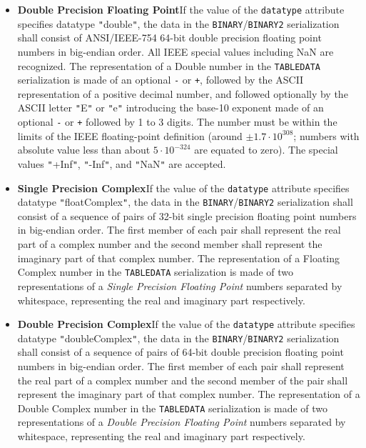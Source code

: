 \documentclass[11pt,a4paper]{ivoa}
\let\fg=\color
\def\attr#1{{\tt{\fg{DarkRed}#1}}}
\def\elem#1{{\tt{\fg{DarkRed}#1}}}
\def\literalvalue#1{{\tt"}{{\fg{DarkPurple}#1}}{\tt"}}
\begin{document}
\begin{itemize}
\item {\bf Double Precision Floating Point}\quad If
the value of the {\attr{datatype}}
attribute specifies datatype {\literalvalue{double}},
the data in the \elem{BINARY}/\elem{BINARY2} serialization shall consist of ANSI/IEEE-754
64-bit double precision floating point numbers in big-endian order.
All IEEE special values including NaN are recognized.
The representation of a Double number in the
\elem{TABLEDATA} serialization is made of an optional {\tt-} or {\tt+},
followed by the ASCII representation of a positive decimal number,
and followed optionally by the ASCII letter \literalvalue{E} or  \literalvalue{e}
introducing the base-10 exponent made of an optional {\tt-} or {\tt+}
followed by 1 to 3 digits. The number must be within the limits of the
IEEE floating-point definition (around $\pm1.7\cdot10^{308}$; numbers with
absolute value less than about $5\cdot10^{-324}$ are equated to zero).
The special
values \literalvalue{+Inf}, \literalvalue{-Inf}, and \literalvalue{NaN} are accepted.

\item {\bf Single Precision Complex}\quad If the value of the {\attr{datatype}}
attribute specifies datatype {\literalvalue{floatComplex}},
the data in the \elem{BINARY}/\elem{BINARY2} serialization shall consist of a sequence of
pairs of 32-bit single precision floating point numbers in big-endian order.
The first member of each
pair shall represent the real part of a complex number and the
second member shall represent the imaginary part of that complex
number.
The representation of a Floating Complex number in the
\elem{TABLEDATA} serialization is made of two representations
of a {\em  Single Precision Floating Point} numbers separated by
whitespace, representing the real and imaginary part respectively.

\item {\bf Double Precision Complex}\quad If the
value of the {\attr{datatype}}
attribute specifies datatype {\literalvalue{doubleComplex}},
the data in the \elem{BINARY}/\elem{BINARY2} serialization  shall consist of a
sequence of pairs of 64-bit double precision floating point numbers
in big-endian order.
The first member of each pair shall represent the real part of a
complex number and the second member of the pair shall represent the
imaginary part of that complex number.
The representation of a Double Complex number in the
\elem{TABLEDATA} serialization is made of two representations
of a {\em  Double Precision Floating Point} numbers separated by
whitespace, representing the real and imaginary part respectively.
\end{itemize}
\end{document}
